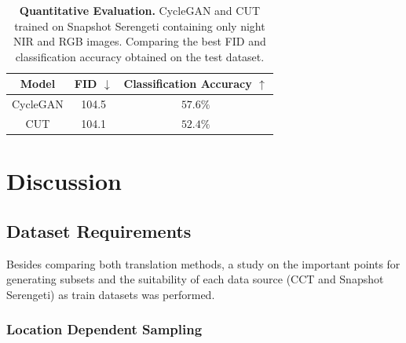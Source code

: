 \documentclass[a4paper,11pt, DIV=12]{scrartcl}
\begin{document}
\begin{table}[h]
   \centering
   \begin{tabular}{c | c | c}
      Model    & FID  $\downarrow$ & Classification Accuracy $\uparrow$ \\
      \hline\hline
      CycleGAN & 104.5             & $\mathbf{57.6\%}$                  \\
      CUT      & 104.1             & $52.4\%$
   \end{tabular}
   \caption{
      \textbf{Quantitative Evaluation.} CycleGAN and CUT trained on Snapshot Serengeti \cite{serengeti} containing only night NIR and RGB images.
      Comparing the best FID and classification accuracy obtained on the test dataset.
   }
   \label{fig:network-comparison-quan}
\end{table}

\section{Discussion}
\subsection{Dataset Requirements}
Besides comparing both translation methods, a study on the important points for generating subsets and the suitability of each data source
(CCT and Snapshot Serengeti) as train datasets was performed.

\subsubsection*{Location Dependent Sampling}
\end{document}
